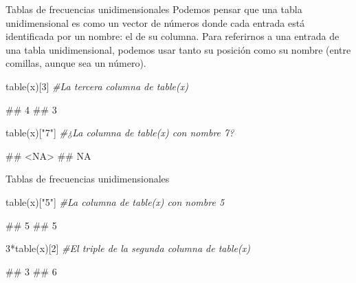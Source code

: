 \documentclass[
  ignorenonframetext,
  aspectratio=169]{beamer}
\newenvironment{Shaded}{\begin{snugshade}}{\end{snugshade}}
\newcommand{\CommentTok}[1]{\textcolor[rgb]{0.56,0.35,0.01}{\textit{#1}}}
\newcommand{\DecValTok}[1]{\textcolor[rgb]{0.00,0.00,0.81}{#1}}
\newcommand{\FunctionTok}[1]{\textcolor[rgb]{0.00,0.00,0.00}{#1}}
\newcommand{\NormalTok}[1]{#1}
\newcommand{\SpecialCharTok}[1]{\textcolor[rgb]{0.00,0.00,0.00}{#1}}
\newcommand{\StringTok}[1]{\textcolor[rgb]{0.31,0.60,0.02}{#1}}
\let\oldverbatim\verbatim
\let\endoldverbatim\endverbatim
\renewenvironment{verbatim}{\tiny\oldverbatim}{\endoldverbatim}
\begin{document}
\begin{frame}[fragile]{Tablas de frecuencias unidimensionales}
\protect\hypertarget{tablas-de-frecuencias-unidimensionales-5}{}
Podemos pensar que una tabla unidimensional es como un vector de números
donde cada entrada está identificada por un nombre: el de su columna.
Para referirnos a una entrada de una tabla unidimensional, podemos usar
tanto su posición como su nombre (entre comillas, aunque sea un número).

\begin{Shaded}
\begin{Highlighting}[]
\FunctionTok{table}\NormalTok{(x)[}\DecValTok{3}\NormalTok{] }\CommentTok{\#La tercera columna de table(x)}
\end{Highlighting}
\end{Shaded}

\begin{verbatim}
## 4 
## 3
\end{verbatim}

\begin{Shaded}
\begin{Highlighting}[]
\FunctionTok{table}\NormalTok{(x)[}\StringTok{"7"}\NormalTok{] }\CommentTok{\#¿La columna de table(x) con nombre 7?}
\end{Highlighting}
\end{Shaded}

\begin{verbatim}
## <NA> 
##   NA
\end{verbatim}
\end{frame}

\begin{frame}[fragile]{Tablas de frecuencias unidimensionales}
\protect\hypertarget{tablas-de-frecuencias-unidimensionales-6}{}
\begin{Shaded}
\begin{Highlighting}[]
\FunctionTok{table}\NormalTok{(x)[}\StringTok{"5"}\NormalTok{] }\CommentTok{\#La columna de table(x) con nombre 5}
\end{Highlighting}
\end{Shaded}

\begin{verbatim}
## 5 
## 5
\end{verbatim}

\begin{Shaded}
\begin{Highlighting}[]
\DecValTok{3}\SpecialCharTok{*}\FunctionTok{table}\NormalTok{(x)[}\DecValTok{2}\NormalTok{] }\CommentTok{\#El triple de la segunda columna de table(x)}
\end{Highlighting}
\end{Shaded}

\begin{verbatim}
## 3 
## 6
\end{verbatim}
\end{frame}
\end{document}
